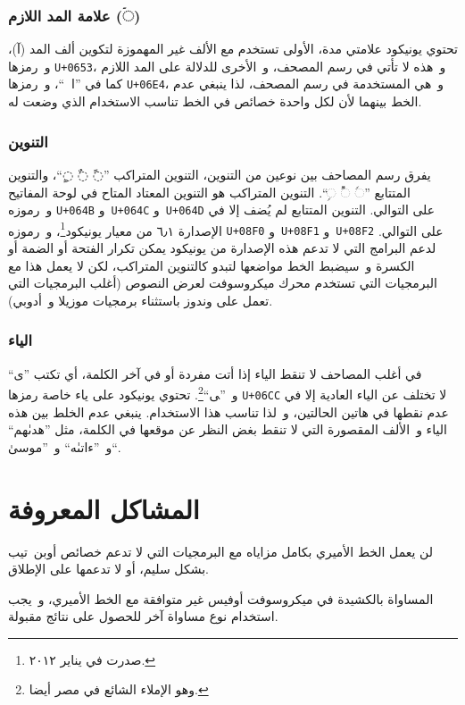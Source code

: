 \documentclass[a4paper]{article}
\renewcommand\U[1]{\colorbox{codecolor}{\texttt{U+#1}}}
\begin{document}
\subsubsection{علامة المد اللازم (\textup{\arabicfont ◌ۤ})}
تحتوي يونيكود علامتي مدة، الأولى تستخدم مع الألف غير المهموزة لتكوين ألف
المد (آ)، و رمزها \U{0653}، و هذه لا تأتي في رسم المصحف، و الأخرى
للدلالة على المد اللازم كما في ”الۤمۤ“، و رمزها \U{06E4}، و هي
المستخدمة في رسم المصحف، لذا ينبغي عدم الخط بينهما لأن لكل واحدة خصائص
في الخط تناسب الاستخدام الذي وضعت له.

\subsubsection{التنوين}
يفرق رسم المصاحف بين نوعين من التنوين، التنوين المتراكب ”◌ً ◌ٌ ◌ٍ“،
والتنوين المتتابع ”◌ࣰ ◌ࣱ ◌ࣲ“. التنوين المتراكب هو التنوين المعتاد المتاح
في لوحة المفاتيح و رموزه \U{064B} و \U{064C}
و \U{064D} على التوالي. التنوين المتتابع لم يُضف إلا في الإصدارة
٦٫١ من معيار يونيكود\footnote{صدرت في يناير ٢٠١٢.}، و رموزه
\U{08F0} و \U{08F1} و \U{08F2} على التوالي. لدعم
البرامج التي لا تدعم هذه الإصدارة من يونيكود يمكن تكرار الفتحة أو الضمة
أو الكسرة و سيضبط الخط مواضعها لتبدو كالتنوين المتراكب، لكن لا يعمل هذا
مع البرمجيات التي تستخدم محرك ميكروسوفت لعرض النصوص (أغلب البرمجيات التي
تعمل على وندوز باستثناء برمجيات موزيلا و أدوبي).

\subsubsection{الياء}
في أغلب المصاحف لا تنقط الياء إذا أتت مفردة أو في آخر الكلمة، أي تكتب
”ی“ و ”‍ی“\footnote{وهو الإملاء الشائع في مصر أيضا.}. تحتوي يونيكود
على ياء خاصة رمزها \U{06CC} لا تختلف عن الياء العادية إلا في عدم
نقطها في هاتين الحالتين، و لذا تناسب هذا الاستخدام. ينبغي عدم الخلط بين
هذه الياء و الألف المقصورة التي لا تنقط بغض النظر عن موقعها في الكلمة،
مثل ”هدىٰهم“ و ”ءاتىٰه“ و ”موسىٰ“.


\section{المشاكل المعروفة}

لن يعمل الخط الأميري بكامل مزاياه مع البرمجيات التي لا تدعم خصائص أوبن تيب بشكل
سليم، أو لا تدعمها على الإطلاق.

المساواة بالكشيدة في ميكروسوفت أوفيس غير متوافقة مع الخط الأميري، و يجب استخدام
نوع مساواة آخر للحصول على نتائج مقبولة.

\end{document}
